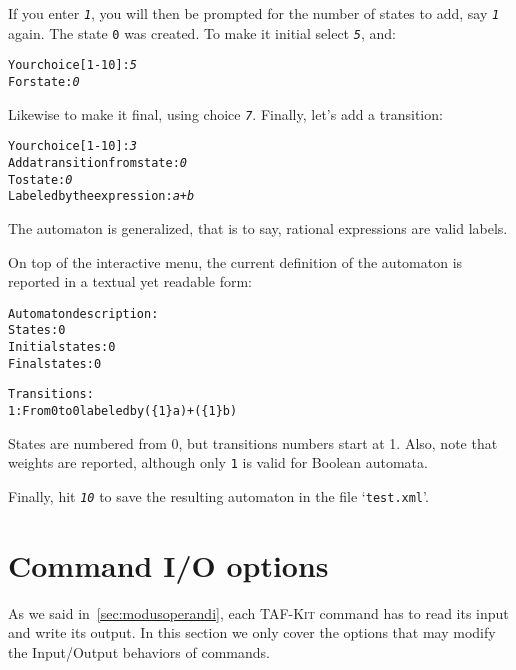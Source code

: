 \documentclass[a4paper]{report}
\newenvironment{shell}
{\begin{alltt}}
{\end{alltt}}
\newcommand\kbd[1]{\textsl{\texttt{#1}}}
\newcommand\file[1]{`\texttt{#1}'}
\newcommand\code[1]{\texttt{#1}}
\newcommand{\tafkit}{\textsc{TAF-Kit}\xspace}
\begin{document}
\noindent
If you enter \kbd{1}, you will then be prompted for the number of
states to add, say \kbd{1} again.  The state \code{0} was created.  To
make it initial select \kbd{5}, and:

\begin{shell}
Your choice [1-10]: \kbd{5}
  For state: \kbd{0}
\end{shell}

Likewise to make it final, using choice \kbd{7}.  Finally, let's add a
transition:

\begin{shell}
Your choice [1-10]: \kbd{3}
  Add a transition from state: \kbd{0}
  To state: \kbd{0}
  Labeled by the expression: \kbd{a+b}
\end{shell}

\noindent
The automaton is generalized, that is to say, rational expressions are
valid labels.

On top of the interactive menu, the current definition of the
automaton is reported in a textual yet readable form:

\begin{shell}
Automaton description:
  States: 0
  Initial states: 0
  Final states: 0

  Transitions:
    1: From 0 to 0 labeled by (\{1\} a)+(\{1\} b)
\end{shell}

\noindent
States are numbered from 0, but transitions numbers start at 1.  Also,
note that weights are reported, although only \code{1} is valid for
Boolean automata.

Finally, hit \kbd{10} to save the resulting automaton in the file
\file{test.xml}.



\section{Command I/O options}\label{sec:iooption}

As we said in~\autoref{sec:modusoperandi}, each \tafkit command has to
read its input and write its output.  In this section we only cover
the options that may modify the Input/Output behaviors of commands.
\end{document}
